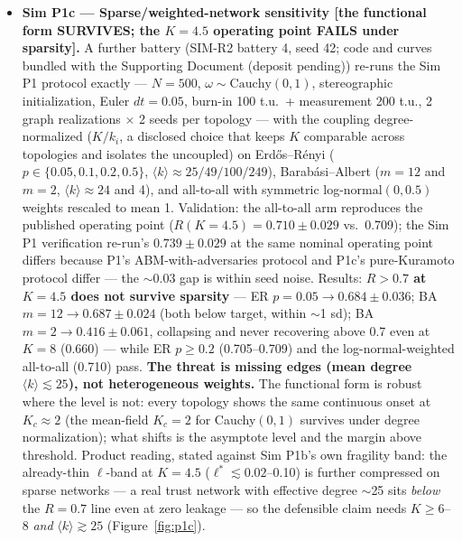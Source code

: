 \documentclass[11pt,twocolumn]{article}
\begin{document}
\begin{itemize}
  fragile, and this paper says so. \textbf{Definitional component:} component (i) of the leakage operationalization
  (\(K_{\mathrm{eff}} = K(1-\ell)\)) makes part of the R-decay
  definitional --- Kuramoto coherence decreases monotonically in
  coupling by construction; the non-definitional content is component
  (ii) (observation noise) and the joint surface's quantitative
  thresholds. The identification of expropriative observation with
  channel attenuation is a modeling assumption, not a derivation; the
  \(\psi\)-model (companion theory preprint, \S3.3) is the stack's mechanistic account of
  chilling.
\item
  \textbf{Sim P1c --- Sparse/weighted-network sensitivity {[}the
  functional form SURVIVES; the \(K = 4.5\) operating point FAILS
  under sparsity{]}.} A further battery (SIM-R2 battery 4, seed 42;
  code and curves bundled with the Supporting Document (deposit pending)) re-runs the
  Sim P1 protocol exactly --- \(N = 500\), \(\omega \sim
  \mathrm{Cauchy}(0,1)\), stereographic initialization, Euler
  \(dt = 0.05\), burn-in 100 t.u.\ + measurement 200 t.u., 2 graph
  realizations \(\times\) 2 seeds per topology --- with the coupling
  degree-normalized (\(K/k_i\), a disclosed choice that keeps \(K\)
  comparable across topologies and isolates the uncoupled) on
  Erd\H{o}s--R\'enyi (\(p \in \{0.05, 0.1, 0.2, 0.5\}\),
  \(\langle k\rangle \approx 25/49/100/249\)), Barab\'asi--Albert
  (\(m = 12\) and \(m = 2\), \(\langle k\rangle \approx 24\)
  and 4), and all-to-all with symmetric log-normal\((0, 0.5)\) weights
  rescaled to mean 1. Validation: the all-to-all arm reproduces the
  published operating point (\(R(K = 4.5) = 0.710 \pm 0.029\) vs.\ 
  0.709); the Sim P1 verification re-run's \(0.739 \pm 0.029\) at
  the same nominal operating point differs because P1's
  ABM-with-adversaries protocol and P1c's pure-Kuramoto protocol
  differ --- the \(\sim\)0.03 gap is within seed noise. Results: \textbf{\(R > 0.7\) at \(K = 4.5\) does not
  survive sparsity} --- ER \(p = 0.05 \to 0.684 \pm 0.036\); BA
  \(m = 12 \to 0.687 \pm 0.024\) (both below target, within
  \(\sim\)1 sd); BA \(m = 2 \to 0.416 \pm 0.061\), collapsing and
  never recovering above 0.7 even at \(K = 8\) (0.660) --- while ER
  \(p \geq 0.2\) (0.705--0.709) and the log-normal-weighted
  all-to-all (0.710) pass. \textbf{The threat is missing edges (mean
  degree \(\langle k\rangle \lesssim 25\)), not heterogeneous
  weights.} The functional form is robust where the level is not:
  every topology shows the same continuous onset at \(K_c \approx 2\)
  (the mean-field \(K_c = 2\) for Cauchy\((0,1)\) survives under
  degree normalization); what shifts is the asymptote level and the
  margin above threshold. Product reading, stated against Sim P1b's
  own fragility band: the already-thin \(\ell\)-band at \(K = 4.5\)
  (\(\ell^{*} \lesssim 0.02\)--0.10) is further compressed on
  sparse networks --- a real trust network with effective degree
  \(\sim\)25 sits \emph{below} the \(R = 0.7\) line even at zero
  leakage --- so the defensible claim needs \(K \geq 6\)--8 \emph{and}
  \(\langle k\rangle \gtrsim 25\) (Figure~\ref{fig:p1c}).


\end{itemize}
\end{document}
